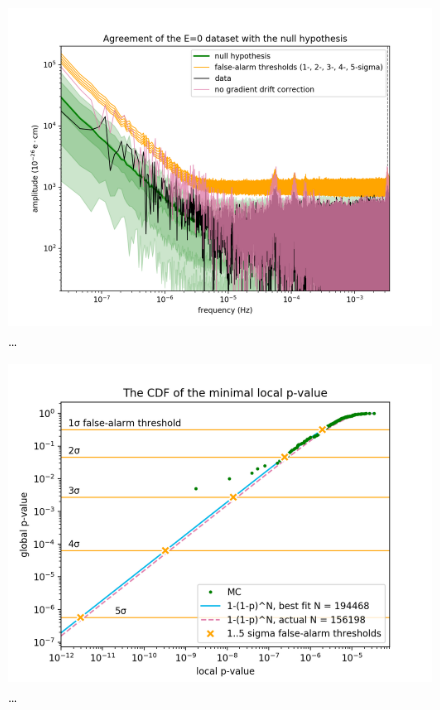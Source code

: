 \begin{figure}
  \centering
  \includegraphics[width=\linewidth]{gfx/axions/E0_detection_and_no_GDC.png}
  \caption{\ldots}
  \label{fig:E0_detection_and_no_GDC}
\end{figure}
\begin{figure}
  \centering
  \includegraphics[width=\linewidth]{gfx/axions/E0_look-elsewhere.png}
  \caption{\ldots}
  \label{fig:E0_look-elsewhere}
\end{figure}
